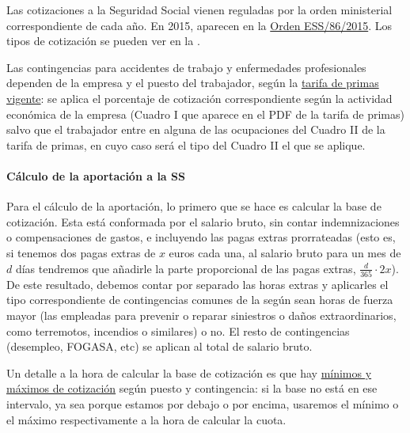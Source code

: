 \documentclass[nochap,palatino,shortheader]{apuntes}
\begin{document}
Las cotizaciones a la Seguridad Social vienen reguladas por la orden ministerial correspondiente de cada año. En 2015, aparecen en la \href{http://www.boe.es/diario_boe/txt.php?id=BOE-A-2015-847}{Orden ESS/86/2015}. Los tipos de cotización se pueden ver en la .

Las contingencias para accidentes de trabajo y enfermedades profesionales dependen de la empresa y el puesto del trabajador, según la \href{http://www.seg-social.es/Internet_1/Trabajadores/CotizacionRecaudaci10777/TarifadePrimasdeATy48410/index.htm}{tarifa de primas vigente}: se aplica el porcentaje de cotización correspondiente según la actividad económica de la empresa (Cuadro I que aparece en el PDF de la tarifa de primas) salvo que el trabajador entre en alguna de las ocupaciones del Cuadro II de la tarifa de primas, en cuyo caso será el tipo del Cuadro II el que se aplique.

\paragraph{Cálculo de la aportación a la SS} Para el cálculo de la aportación, lo primero que se hace es calcular la base de cotización. Esta está conformada por el salario bruto, sin contar indemnizaciones o compensaciones de gastos\footnotemark, e incluyendo las pagas extras prorrateadas (esto es, si tenemos dos pagas extras de $x$ euros cada una, al salario bruto para un mes de $d$ días tendremos que añadirle la parte proporcional de las pagas extras, $\frac{d}{365} \cdot 2x $). De este resultado, debemos contar por separado las horas extras y aplicarles el tipo correspondiente de contingencias comunes de la  según sean horas de fuerza mayor (las empleadas para prevenir o reparar siniestros o daños extraordinarios, como terremotos, incendios o similares) o no. El resto de contingencias (desempleo, FOGASA, etc) se aplican al total de salario bruto.

Un detalle a la hora de calcular la base de cotización es que hay \href{http://www.seg-social.es/Internet_1/Trabajadores/CotizacionRecaudaci10777/Basesytiposdecotiza36537/index.htm}{mínimos y máximos de cotización} según puesto y contingencia: si la base no está en ese intervalo, ya sea porque estamos por debajo o por encima, usaremos el mínimo o el máximo respectivamente a la hora de calcular la cuota.

\end{document}
